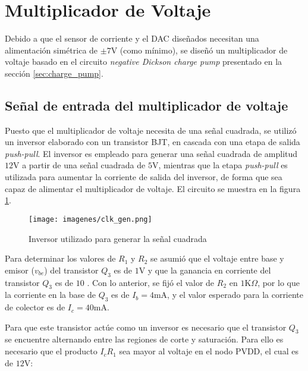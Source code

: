 \section{Multiplicador de Voltaje}

    Debido a que el sensor de corriente y el DAC diseñados necesitan una
    alimentación simétrica de $\pm 7\text{V}$ (como mínimo), se diseñó 
    un multiplicador de voltaje basado en el circuito \textit{negative 
    Dickson charge pump} presentado en la sección \ref{sec:charge_pump}.

    \subsection{Señal de entrada del multiplicador de voltaje}
    
    Puesto que el multiplicador de voltaje necesita de una señal cuadrada, se utilizó un inversor
    elaborado con un transistor BJT, en cascada con una etapa de salida 
    \textit{push-pull}. El inversor es empleado para generar una señal
    cuadrada de amplitud $12\text{V}$ a partir de una señal cuadrada 
    de $5\text{V}$, mientras que la etapa \textit{push-pull}
    es utilizada para aumentar la corriente de salida del inversor, de forma
    que sea capaz de alimentar el multiplicador de voltaje. El circuito
    se muestra en la figura \ref{fig:inversor}.
    
    \begin{figure}[H]
        \centering
        \texttt{[image: imagenes/clk\_gen.png]}
        \caption{Inversor utilizado para generar la señal cuadrada}
        \label{fig:inversor}
    \end{figure}

    Para determinar los valores de $R_1$ y $R_2$
    se asumió que el voltaje entre base y emisor ($v_{be}$) del transistor $Q_3$
    es de $1\text{V}$  y que la ganancia en corriente del 
    transistor $Q_3$ es de $10$ \cite{mmtb5551}. Con lo anterior, se fijó el 
    valor de $R_2$ en $1\text{K}\Omega$, por 
    lo que la corriente en la base de $Q_3$ es de $I_b = 4\text{mA}$, y el valor
     esperado para la corriente de colector es de $I_c = 40\text{mA}$.

    Para que este transistor actúe como un inversor es necesario que 
    el transistor $Q_3$ se encuentre alternando entre
    las regiones de corte y saturación. Para ello es necesario
    que el producto $I_cR_1$ sea mayor al voltaje en el nodo PVDD, el cual
    es de $12\text{V}$:
    
